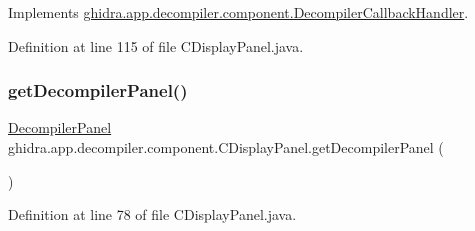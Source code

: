 Implements \mbox{\hyperlink{interfaceghidra_1_1app_1_1decompiler_1_1component_1_1_decompiler_callback_handler_a94124bad6258c05b2de2fd1e9c7069b1}{ghidra.\+app.\+decompiler.\+component.\+Decompiler\+Callback\+Handler}}.



Definition at line 115 of file C\+Display\+Panel.\+java.

\mbox{\label{classghidra_1_1app_1_1decompiler_1_1component_1_1_c_display_panel_aa3f83a21fba71bc8d3d6acfb8efb3882}} 
\subsubsection{\texorpdfstring{getDecompilerPanel()}{getDecompilerPanel()}}
{\footnotesize\ttfamily \mbox{\hyperlink{classghidra_1_1app_1_1decompiler_1_1component_1_1_decompiler_panel}{Decompiler\+Panel}} ghidra.\+app.\+decompiler.\+component.\+C\+Display\+Panel.\+get\+Decompiler\+Panel (\begin{DoxyParamCaption}{ }\end{DoxyParamCaption})\hspace{0.3cm}{\ttfamily [inline]}}



Definition at line 78 of file C\+Display\+Panel.\+java.

